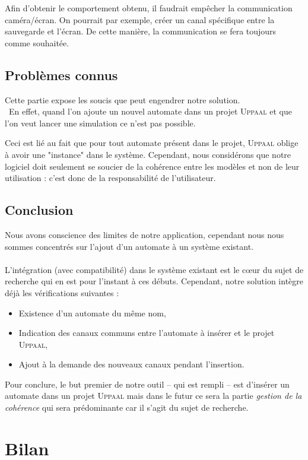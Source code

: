 \documentclass[12pt,a4paper]{report}
\begin{document}
    Afin d'obtenir le comportement obtenu, il faudrait empêcher la communication caméra/écran. On pourrait par exemple, créer un canal spécifique entre la sauvegarde et l'écran. De cette manière, la communication se fera toujours comme souhaitée.

\newpage
\section{Problèmes connus}
Cette partie expose les soucis que peut engendrer notre solution.
\\\
En effet, quand l'on ajoute un nouvel automate dans un projet \textsc{Uppaal} et que l'on 
veut lancer une simulation ce n'est pas possible.

Ceci est lié au fait que pour tout automate présent dans le projet, \textsc{Uppaal} oblige à 
avoir une "instance" dans le système. Cependant, nous considérons que notre logiciel doit 
seulement se soucier de la cohérence entre les modèles et non de leur utilisation : c'est 
donc de la responsabilité de l'utilisateur.

\section{Conclusion}
    Nous avons conscience des limites de notre application, cependant nous nous sommes concentrés sur l'ajout d'un automate à un système existant.
\\\\
    L'intégration (avec compatibilité) dans le système existant est le cœur du sujet de 
    recherche qui en est pour l'instant à ces débuts. Cependant, notre solution intègre déjà les vérifications suivantes :
    
    \begin{itemize}
    \item Existence d'un automate du même nom,
    \item Indication des canaux communs entre l'automate à insérer et le projet \textsc{Uppaal},
    \item Ajout à la demande des nouveaux canaux pendant l'insertion.
    \end{itemize}
    
Pour conclure, le but premier de notre outil -- qui est rempli --  est d'insérer un automate 
dans un projet \textsc{Uppaal} mais dans le futur ce sera la partie 
\emph{gestion de la cohérence} qui sera prédominante car il s'agit du sujet de recherche.


\chapter{Bilan}
\end{document}
